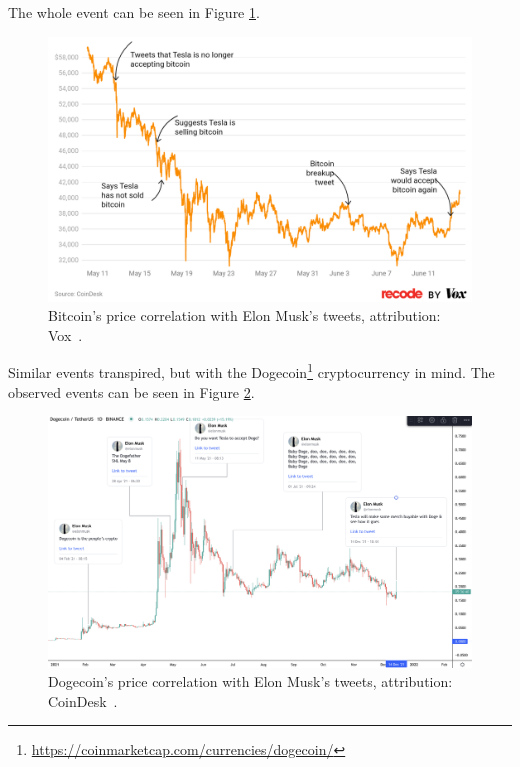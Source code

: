 The whole event can be seen in Figure \ref{figure-vox-elon}.

\begin{figure}[!hbt]
    \centering
    \includegraphics[width=\columnwidth]{figures/vox-elon.png}
    \caption{Bitcoin's price correlation with Elon Musk's tweets, attribution: Vox~\cite{vox:elon}.}
    \label{figure-vox-elon}
\end{figure}

Similar events transpired, but with the Dogecoin\footnote{\url{https://coinmarketcap.com/currencies/dogecoin/}} cryptocurrency in mind. The observed events can be seen in Figure \ref{figure-coindesk-elon}.

\begin{figure}[!hbt]
    \centering
    \includegraphics[width=\columnwidth]{figures/coindesk-elon.png}
    \caption{Dogecoin's price correlation with Elon Musk's tweets, attribution: CoinDesk~\cite{coindesk:elon}.}
    \label{figure-coindesk-elon}
\end{figure}

